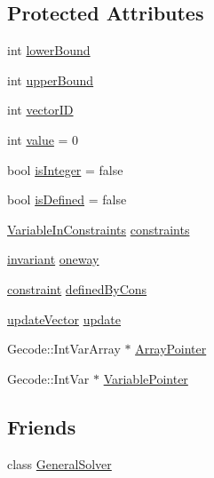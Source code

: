 \subsection*{Protected Attributes}
\begin{DoxyCompactItemize}
\item 
int \hyperlink{class_integer_variable_a3aeb7c174cc51b436125d0b89d6acf6a}{lower\-Bound}
\item 
int \hyperlink{class_integer_variable_af970be2cc8ecd64ea7e7c021b1e2788e}{upper\-Bound}
\item 
int \hyperlink{class_integer_variable_ae81f86d5b1436c30b535e17b8b0101ed}{vector\-I\-D}
\item 
int \hyperlink{class_integer_variable_afbdeafc29f2cde02d187f37dc9787e7e}{value} = 0
\item 
bool \hyperlink{class_integer_variable_aff13579bdd9546684ebfe66f92297344}{is\-Integer} = false
\item 
bool \hyperlink{class_integer_variable_adab57321e01f48d8c977af72b4507e0b}{is\-Defined} = false
\item 
\hyperlink{_constants_8hpp_a02baa5ed1a26d5d8a8c4adb2d0e59a57}{Variable\-In\-Constraints} \hyperlink{class_integer_variable_a3622cee463344a82ebec9559a0cc0925}{constraints}
\item 
\hyperlink{_constants_8hpp_ac9b562f250a09412c017b68185321eba}{invariant} \hyperlink{class_integer_variable_a94970626989383f0fbc4b6c7b748f0fe}{oneway}
\item 
\hyperlink{_constants_8hpp_ab3a9f5ca3242dd173f530bb9f68fc611}{constraint} \hyperlink{class_integer_variable_aab3394e928b38ae8fb8474a02fffeb80}{defined\-By\-Cons}
\item 
\hyperlink{_constants_8hpp_a318698c81469739a632fe21db9b9eb3b}{update\-Vector} \hyperlink{class_integer_variable_ab4b11ddfbd5cc6cb2d2785693d532b2c}{update}
\item 
Gecode\-::\-Int\-Var\-Array $\ast$ \hyperlink{class_integer_variable_ab65c2230563c105c5f558fe709ad11b8}{Array\-Pointer}
\item 
Gecode\-::\-Int\-Var $\ast$ \hyperlink{class_integer_variable_ac8d0d023d1051a0f046bed10c072b993}{Variable\-Pointer}
\end{DoxyCompactItemize}
\subsection*{Friends}
\begin{DoxyCompactItemize}
\item 
class \hyperlink{class_integer_variable_a831d0dd732f452551b0c77214ccbf558}{General\-Solver}
\end{DoxyCompactItemize}


